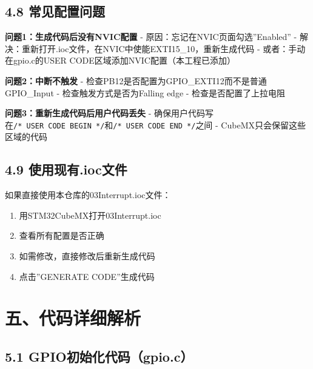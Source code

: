 \documentclass[
  chinese,
  UTF8,
  oneside,
  openany]{ctexbook}
\providecommand{\tightlist}{%
  \setlength{\itemsep}{0pt}\setlength{\parskip}{0pt}}
\begin{document}
\subsection{4.8
常见配置问题}\label{ux5e38ux89c1ux914dux7f6eux95eeux9898}

\textbf{问题1：生成代码后没有NVIC配置} -
原因：忘记在NVIC页面勾选''Enabled'' -
解决：重新打开.ioc文件，在NVIC中使能EXTI15\_10，重新生成代码 -
或者：手动在gpio.c的USER CODE区域添加NVIC配置（本工程已添加）

\textbf{问题2：中断不触发} -
检查PB12是否配置为GPIO\_EXTI12而不是普通GPIO\_Input -
检查触发方式是否为Falling edge - 检查是否配置了上拉电阻

\textbf{问题3：重新生成代码后用户代码丢失} -
确保用户代码写在\texttt{/*\ USER\ CODE\ BEGIN\ */}和\texttt{/*\ USER\ CODE\ END\ */}之间
- CubeMX只会保留这些区域的代码

\subsection{4.9
使用现有.ioc文件}\label{ux4f7fux7528ux73b0ux6709.iocux6587ux4ef6}

如果直接使用本仓库的03Interrupt.ioc文件：

\begin{enumerate}
\def\labelenumi{\arabic{enumi}.}
\tightlist
\item
  用STM32CubeMX打开03Interrupt.ioc
\item
  查看所有配置是否正确
\item
  如需修改，直接修改后重新生成代码
\item
  点击''GENERATE CODE''生成代码
\end{enumerate}

\section{五、代码详细解析}\label{ux4e94ux4ee3ux7801ux8be6ux7ec6ux89e3ux6790}

\subsection{5.1
GPIO初始化代码（gpio.c）}\label{gpioux521dux59cbux5316ux4ee3ux7801gpio.c}
\end{document}

